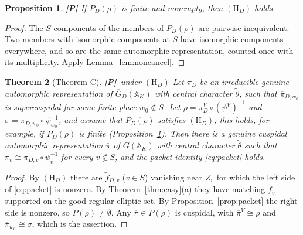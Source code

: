 \documentclass[12pt]{article}
\newcommand{\ov}[1]{\overline{#1}}
\newcommand{\A}{\mathbb{A}}
\newcommand{\Gb}{\ov{G}}
\newcommand{\Zb}{\ov{Z}}
\newcommand{\GDb}{\ov{G}_D}
\newcommand{\pib}{\ov{\pi}}
\newcommand{\Pv}{\textbf{[P]}}
\theoremstyle{plain}
\newtheorem{theorem}{Theorem}[section]
\newtheorem{proposition}[theorem]{Proposition}
\theoremstyle{definition}
\begin{document}
\begin{proposition}\label{prop:HDfinite}\Pv
If $P_D(\rho)$ is finite and nonempty, then $(\mathrm H_D)$ holds.
\end{proposition}
\begin{proof}
The $S$-components of the members of $P_D(\rho)$ are pairwise inequivalent. Two members with isomorphic components at $S$ have isomorphic components everywhere, and so are the same automorphic representation, counted once with its multiplicity. Apply Lemma~\ref{lem:noncancel}.
\end{proof}

\begin{theorem}[Theorem C]\label{thm:transfer}\Pv\ under $(\mathrm H_D)$
Let $\pib_D$ be an irreducible genuine automorphic representation of $\GDb(\A_K)$ with central character $\tilde\theta$, such that $\pib_{D,w_0}$ is supercuspidal for some finite place $w_0\notin S$. Let $\rho=\pib_D^V\circ(\psi^V)^{-1}$ and $\sigma=\pib_{D,w_0}\circ\psi_{w_0}^{-1}$, and assume that $P_D(\rho)$ satisfies $(\mathrm H_D)$; this holds, for example, if $P_D(\rho)$ is finite (Proposition~\ref{prop:HDfinite}). Then there is a genuine cuspidal automorphic representation $\pib$ of $\Gb(\A_K)$ with central character $\tilde\theta$ such that $\pib_v\cong\pib_{D,v}\circ\psi_v^{-1}$ for every $v\notin S$, and the packet identity \eqref{eq:packet} holds.
\end{theorem}

\begin{proof}
By $(\mathrm H_D)$ there are $\tilde f_{D,v}$ ($v\in S$) vanishing near $\Zb_v$ for which the left side of \eqref{eq:packet} is nonzero. By Theorem~\ref{thm:easy}(a) they have matching $\tilde f_v$ supported on the good regular elliptic set. By Proposition~\ref{prop:packet} the right side is nonzero, so $P(\rho)\ne\emptyset$. Any $\pib\in P(\rho)$ is cuspidal, with $\pib^V\cong\rho$ and $\pib_{w_0}\cong\sigma$, which is the assertion.
\end{proof}
\end{document}
